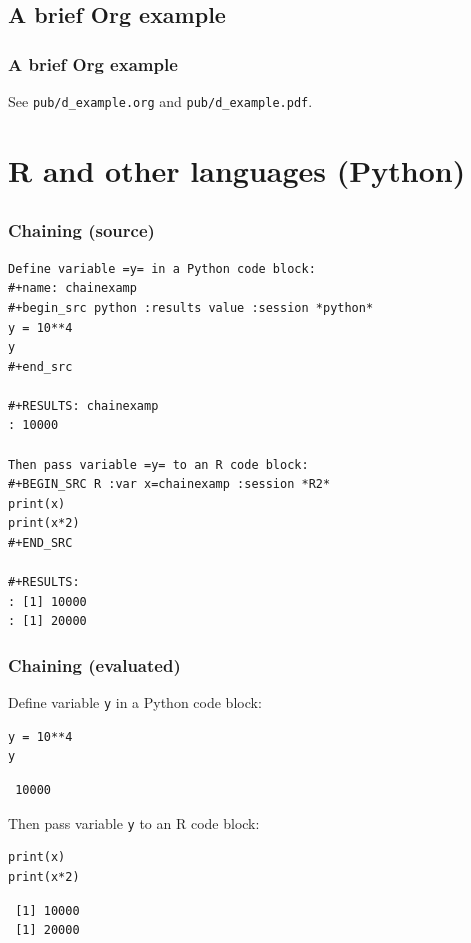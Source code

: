 \documentclass[bigger]{beamer}
\begin{document}
\subsection{A brief Org example}
\label{sec-3-4}
\begin{frame}
\frametitle{A brief Org example}
\label{sec-3-4-1}


See \texttt{pub/d\_example.org} and \texttt{pub/d\_example.pdf}.
\end{frame}
\section{R and other languages (Python)}
\label{sec-4}
\subsection{}
\begin{frame}[fragile,shrink = 10]
\frametitle{Chaining (source)}
\label{sec-4-1-1}




\lstset{language=org}
\begin{lstlisting}
Define variable =y= in a Python code block: 
#+name: chainexamp
#+begin_src python :results value :session *python*
y = 10**4
y
#+end_src

#+RESULTS: chainexamp
: 10000

Then pass variable =y= to an R code block:
#+BEGIN_SRC R :var x=chainexamp :session *R2*
print(x)
print(x*2)
#+END_SRC

#+RESULTS:
: [1] 10000
: [1] 20000
\end{lstlisting}
\end{frame}
\begin{frame}[fragile]
\frametitle{Chaining (evaluated)}
\label{sec-4-1-2}


Define variable \texttt{y} in a Python code block: 

\lstset{language=Python}
\begin{lstlisting}
y = 10**4
y
\end{lstlisting}

\begin{verbatim}
 10000
\end{verbatim}


Then pass variable \texttt{y} to an R code block:

\lstset{language=R}
\begin{lstlisting}
print(x)
print(x*2)
\end{lstlisting}

\begin{verbatim}
 [1] 10000
 [1] 20000
\end{verbatim}
\end{frame}
\end{document}
